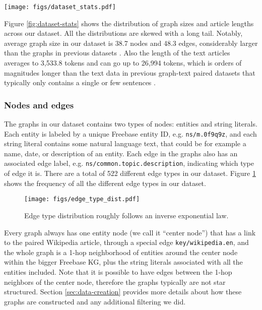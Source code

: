 \documentclass[11pt]{article}
\newcommand{\ourdataset}{{WikiGraphs}}
\newcommand{\secref}[1]{Section \ref{#1}}
\newcommand{\figref}[1]{Figure \ref{#1}}
\begin{document}
\begin{figure*}[t]
    \centering
    \texttt{[image: figs/dataset\_stats.pdf]}
    \caption{Distribution of graph and article sizes across our \ourdataset~dataset.}
    \label{fig:dataset-stats}
\end{figure*}

\figref{fig:dataset-stats} shows the distribution of graph sizes and article lengths across our dataset.  All the distributions are skewed with a long tail.  Notably, average graph size in our dataset is 38.7 nodes and 48.3 edges, considerably larger than the graphs in previous datasets \cite{jin-etal-2020-genwiki, gardent-etal-2017-webnlg}. Also the length of the text articles averages to 3,533.8 tokens and can go up to 26,994 tokens, which is orders of magnitudes longer than the text data in previous graph-text paired datasets that typically only contains a single or few sentences \cite{jin-etal-2020-genwiki,gardent-etal-2017-webnlg, lebret-etal-2016-neural}.

\subsubsection{Nodes and edges}


The graphs in our dataset contains two types of nodes: entities and string literals.  Each entity is labeled by a unique Freebase entity ID, e.g. \texttt{ns/m.0f9q9z}, and each string literal contains some natural language text, that could be for example a name, date, or description of an entity.  Each edge in the graphs also has an associated edge label, e.g. \texttt{ns/common.topic.description}, indicating which type of edge it is.  There are a total of 522 different edge types in our dataset.  \figref{fig:edge-type-dist} shows the frequency of all the different edge types in our dataset.

\begin{figure}[th]
    \centering
    \texttt{[image: figs/edge\_type\_dist.pdf]}
    \caption{Edge type distribution roughly follows an inverse exponential law.}
    \label{fig:edge-type-dist}
\end{figure}

Every graph always has one entity node (we call it ``center node'') that has a link to the paired Wikipedia article, through a special edge \texttt{key/wikipedia.en}, and the whole graph is a 1-hop neighborhood of entities around the center node within the bigger Freebase KG, plus the string literals associated with all the entities included.  Note that it is possible to have edges between the 1-hop neighbors of the center node, therefore the graphs typically are not star structured. \secref{sec:data-creation} provides more details about how these graphs are constructed and any additional filtering we did.
\end{document}
